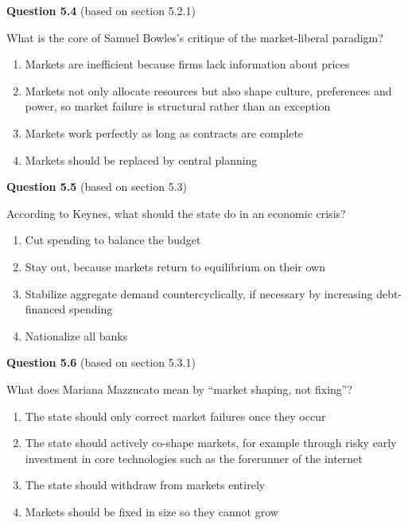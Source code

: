 \documentclass[
  british,
  a4paper,
  DIV=11,
  numbers=noendperiod,
  oneside,
  openany]{scrreprt}
\providecommand{\tightlist}{%
  \setlength{\itemsep}{0pt}\setlength{\parskip}{0pt}}
\begin{document}
\textbf{Question 5.4} (based on section 5.2.1)

What is the core of Samuel Bowles's critique of the market-liberal
paradigm?

\begin{enumerate}
\def\labelenumi{\alph{enumi})}
\tightlist
\item
  Markets are inefficient because firms lack information about prices
\item
  Markets not only allocate resources but also shape culture,
  preferences and power, so market failure is structural rather than an
  exception
\item
  Markets work perfectly as long as contracts are complete
\item
  Markets should be replaced by central planning
\end{enumerate}

\textbf{Question 5.5} (based on section 5.3)

According to Keynes, what should the state do in an economic crisis?

\begin{enumerate}
\def\labelenumi{\alph{enumi})}
\tightlist
\item
  Cut spending to balance the budget
\item
  Stay out, because markets return to equilibrium on their own
\item
  Stabilize aggregate demand countercyclically, if necessary by
  increasing debt-financed spending
\item
  Nationalize all banks
\end{enumerate}

\textbf{Question 5.6} (based on section 5.3.1)

What does Mariana Mazzucato mean by ``market shaping, not fixing''?

\begin{enumerate}
\def\labelenumi{\alph{enumi})}
\tightlist
\item
  The state should only correct market failures once they occur
\item
  The state should actively co-shape markets, for example through risky
  early investment in core technologies such as the forerunner of the
  internet
\item
  The state should withdraw from markets entirely
\item
  Markets should be fixed in size so they cannot grow
\end{enumerate}
\end{document}
